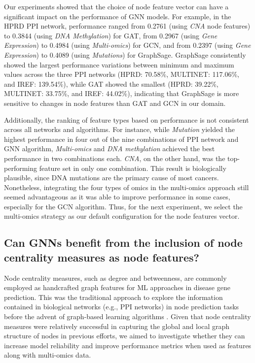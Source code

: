 Our experiments showed that the choice of node feature vector can have a significant impact on the performance of GNN models. For example, in the HPRD PPI network, performance ranged from 0.2761 (using \textit{CNA} node features) to 0.3844 (using \textit{DNA Methylation}) for GAT, from 0.2967 (using \textit{Gene Expression}) to 0.4984 (using \textit{Multi-omics}) for GCN, and from 0.2397 (using \textit{Gene Expression}) to 0.4089 (using \textit{Mutations}) for GraphSage. GraphSage consistently showed the largest performance variations between minimum and maximum values across the three PPI networks (HPRD: 70.58\%, MULTINET: 117.06\%, and IREF: 139.54\%), while GAT showed the smallest (HPRD: 39.22\%, MULTINET: 33.75\%, and IREF: 44.02\%), indicating that GraphSage is more sensitive to changes in node features than GAT and GCN in our domain.

Additionally, the ranking of feature types based on performance is not consistent across all networks and algorithms. For instance, while \textit{Mutation} yielded the highest performance in four out of the nine combinations of PPI network and GNN algorithm,  \textit{Multi-omics} and \textit{DNA methylation} achieved the best performance in two combinations each. \textit{CNA}, on the other hand, was the top-performing feature set in only one combination. This result is biologically plausible, since DNA mutations are the primary cause of most cancers. Nonetheless, integrating the four types of omics in the multi-omics approach still seemed advantageous as it was able to improve performance in some cases, especially for the GCN algorithm. Thus, for the next experiment, we select the multi-omics strategy as our default configuration for the node features vector.



\subsection{Can GNNs benefit from the inclusion of node centrality measures as node features?}
\label{sec:results:comparative_evaluation:rq2}

Node centrality measures, such as degree and betweenness,  %
are commonly employed as handcrafted graph features for ML approaches in disease gene prediction. This was the traditional approach to explore the information contained in biological networks (e.g., PPI networks) in node prediction tasks before the advent of graph-based learning algorithms \cite{ata2021recent}. Given that node centrality measures were relatively successful in capturing the global and local graph structure of nodes in previous efforts, we aimed to investigate whether they can increase model reliability and improve performance metrics when used as features along with multi-omics data.


